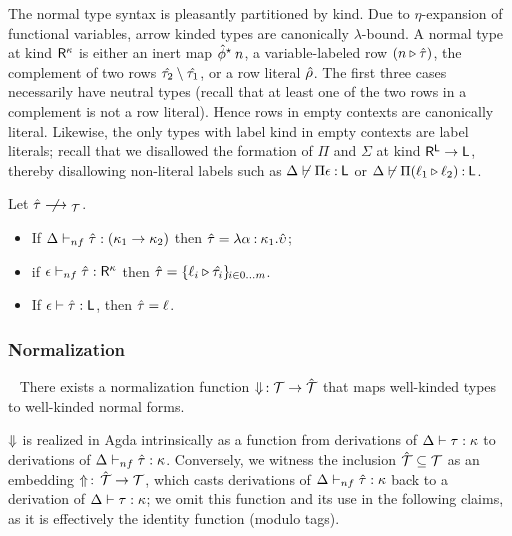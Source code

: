 \documentclass[authoryear, acmsmall, screen, review, nonacm]{acmart} %
\begin{document}
The normal type syntax is pleasantly partitioned by kind. Due to $\eta$-expansion of functional variables, arrow kinded types are canonically $\lambda$-bound. A normal type at kind $\RowK \kappa$ is either an inert map $\hat{\phi}^{\TypeK} \, n$, a variable-labeled row $(\LabTy n \Normal \tau)$, the complement of two rows $\Normal {\tau_{2}} \Compl \Normal {\tau_{1}}$, or a row literal $\Normal \rho$. The first three cases necessarily have neutral types (recall that at least one of the two rows in a complement is not a row literal). Hence rows in empty contexts are canonically literal. Likewise, the only types with label kind in empty contexts are label literals; recall that we disallowed the formation of $\Pi$ and $\Sigma$ at kind $\RowK \LabK \to \LabK$, thereby disallowing non-literal labels such as $\Delta \not\vdash \Pi \epsilon \co \LabK$ or $\Delta \not\vdash \Pi (\LabTy {\ell_{1}} {\ell_{2}}) \co \LabK$.

\begin{theorem}[Canonicity]
  Let $\Normal\tau \NRedT$.
  \begin{itemize}
    \item If $\KindJNF \Delta {\Normal\tau} {(\kappa_{1} \to \kappa_{2})}$ then $\Normal\tau = {\lambda \alpha \co \kappa_{1}. \Normal\upsilon}$;
    \item if $\KindJNF \epsilon {\Normal\tau} {\RowK \kappa}$ then $\Normal\tau =  \RowIx i 0 m {\LabTy {\ell_i} {\Normal{\tau_i}}}$.
    \item If $\KindJ \epsilon {\Normal\tau} \LabK$, then $\Normal\tau = \ell$.
  \end{itemize}
\end{theorem}
\subsubsection{Normalization}
\begin{theorem}[Normalization] ~
  There exists a normalization function $\Norm\, : \Types \to \NormalTypes$ that maps well-kinded types to well-kinded normal forms.
\end{theorem}

$\Norm$ is realized in Agda intrinsically as a function from derivations of $\KindJ \Delta \tau \kappa$ to derivations of $\KindJNF \Delta {\Normal{\tau}} \kappa$.  Conversely, we witness the inclusion $\NormalTypes \subseteq \Types$ as an embedding $\Embed \,:\, \NormalTypes \to \Types$, which casts derivations of $\KindJNF \Delta {\Normal \tau} \kappa$  back to a derivation of $\KindJ \Delta \tau \kappa$; we omit this function and its use in the following claims, as it is effectively the identity function (modulo tags).
\end{document}
